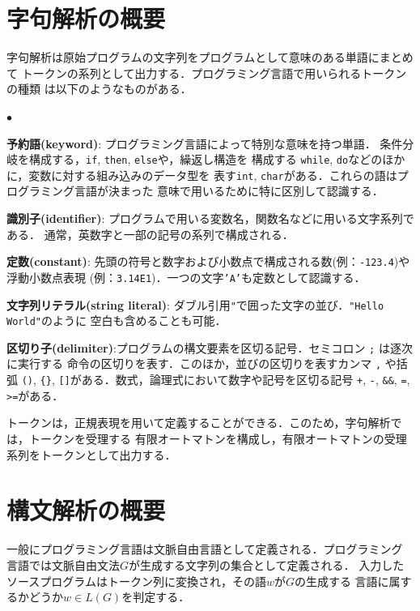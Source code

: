 \documentclass[a4j,dvipdfmx]{jbook}
\begin{document}
\section{字句解析の概要}

字句解析は原始プログラムの文字列をプログラムとして意味のある単語にまとめて
トークンの系列として出力する．プログラミング言語で用いられるトークンの種類
は以下のようなものがある．

\begin{list}{$\bullet$}{\setlength{\leftmargin}{10pt}}
  \item {\bf 予約語(keyword)}: プログラミング言語によって特別な意味を持つ単語．
        条件分岐を構成する，\texttt{if}, \texttt{then}, \texttt{else}や，繰返し構造を
        構成する \texttt{while}, \texttt{do}などのほかに，変数に対する組み込みのデータ型を
        表す\texttt{int}, \texttt{char}がある．これらの語はプログラミング言語が決まった
        意味で用いるために特に区別して認識する．
  \item {\bf 識別子(identifier)}: プログラムで用いる変数名，関数名などに用いる文字系列である．
        通常，英数字と一部の記号の系列で構成される．
  \item {\bf 定数(constant)}: 先頭の符号と数字および小数点で構成される数(例：\texttt{-123.4})や浮動小数点表現
        (例：\texttt{3.14E1})．一つの文字\texttt{'A'}も定数として認識する．
  \item {\bf 文字列リテラル(string literal)}: ダブル引用\texttt{"}で囲った文字の並び．\texttt{"Hello World"}のように
        空白も含めることも可能．
  \item {\bf 区切り子(delimiter)}:プログラムの構文要素を区切る記号．セミコロン \texttt{;} は逐次に実行する
        命令の区切りを表す．このほか，並びの区切りを表すカンマ \texttt{,} や括弧 \texttt{()},
        \texttt{\{\}}, \texttt{[]}がある．数式，論理式において数字や記号を区切る記号
        \texttt{+}, \texttt{-}, \texttt{\&\&}, \texttt{=}, \texttt{>=}がある．
\end{list}

トークンは，正規表現を用いて定義することができる．このため，字句解析では，トークンを受理する
有限オートマトンを構成し，有限オートマトンの受理系列をトークンとして出力する．

\section{構文解析の概要}

一般にプログラミング言語は文脈自由言語として定義される．プログラミング
言語では文脈自由文法$G$が生成する文字列の集合として定義される．
入力したソースプログラムはトークン列に変換され，その語$w$が$G$の生成する
言語に属するかどうか$w\in L(G)$を判定する．
\end{document}

